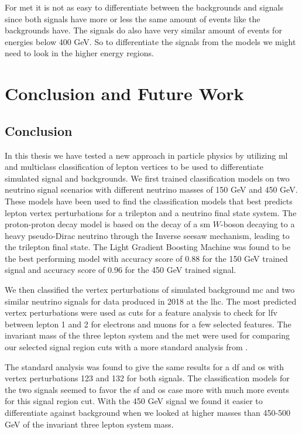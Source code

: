 \documentclass[a4paper, american, 12pt]{report}
\begin{document}
	For \acrshort{met} it is not as easy to differentiate between the backgrounds and signals since both signals have more or less the same amount of events like the backgrounds have. The signals do also have very similar amount of events for energies below 400 GeV. So to differentiate the signals from the models we might need to look in the higher energy regions.
	
	

	\chapter{Conclusion and Future Work}
	\label{chap:Conclusion}	
	
	\section{Conclusion}
	\label{sect:Conclusion-Conclusion}
	In this thesis we have tested a new approach in particle physics by utilizing \acrshort{ml} and multiclass classification of lepton vertices to be used to differentiate simulated signal and backgrounds. We first trained classification models on two neutrino signal scenarios with different neutrino masses of 150 GeV and 450 GeV. These models have been used to find the classification models that best predicts lepton vertex perturbations for a trilepton and a neutrino final state system. The proton-proton decay model is based on the decay of a \acrshort{sm} $W$-boson decaying to a heavy pseudo-Dirac neutrino through the Inverse seesaw mechanism, leading to the trilepton final state. The Light Gradient Boosting Machine was found to be the best performing model with accuracy score of 0.88 for the 150 GeV trained signal and accuracy score of 0.96 for the 450 GeV trained signal.
	
	We then classified the vertex perturbations of simulated background \acrshort{mc} and two similar neutrino signals for data produced in 2018 at the \acrshort{lhc}. The most predicted vertex perturbations were used as cuts for a feature analysis to check for \acrshort{lfv} between lepton 1 and 2 for electrons and muons for a few selected features. The invariant mass of the three lepton system and the \acrshort{met} were used for comparing our selected signal region cuts with a more standard analysis from \citet{inverseseesaw}. 
	
	The standard analysis was found to give the same results for a \acrshort{df} and \acrshort{os} with vertex perturbations 123 and 132 for both signals. The classification models for the two signals seemed to favor the \acrshort{sf} and \acrshort{os} case more with much more events for this signal region cut. With the 450 GeV signal we found it easier to differentiate against background when we looked at higher masses than 450-500 GeV of the invariant three lepton system mass.
\end{document}
